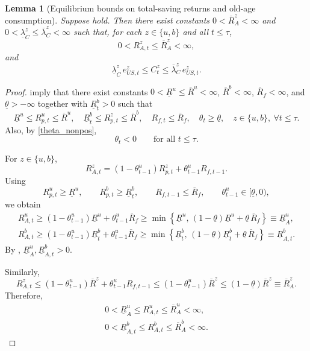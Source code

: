 \documentclass[12pt]{article}
\theoremstyle{plain}
\newtheorem{lem}{Lemma}
\begin{document}
\begin{lem}[Equilibrium bounds on total-saving returns and old-age consumption]\label{lem_total_return_consumption_bounds}
Suppose
hold.
Then there exist constants $0< \overline R^z_A<\infty$ and
$0<\underline\lambda^z_C\le \overline\lambda^z_C<\infty$ such that, for each $z\in\{u,b\}$ and all $t\le\tau$,
\[
0< R_{A,t}^z\le \overline R^z_A<\infty,
\]
and
\[
\underline\lambda^z_C\,e_{US,t}^z
\le
C_t^z
\le
\overline\lambda^z_C\,e_{US,t}^z.
\]
\end{lem}

\begin{proof}
 imply that there exist constants
$0<\underline R^u\le \overline R^u<\infty$, $\overline R^b<\infty$, $\overline R_f<\infty$, and $\underline\theta>-\infty$ together with $\underline R^b_t>0$ such that
\[
\underline R^u\le R_{p,t}^u\le \overline R^u,
\quad
\underline R^b_t\le R_{p,t}^z\le \overline R^b,
\quad
R_{f,t}\le \overline R_f,
\quad
	\theta_t\ge \underline{\theta},
\quad
z\in\{u,b\},\ \forall t\le\tau.
\]
Also, by \eqref{theta_nonpos},
\[
	\theta_t<0
\qquad\text{for all }t\le\tau.
\]

For $z\in\{u,b\}$,
\[
R_{A,t}^z=(1-\theta_{t-1}^u)R_{p,t}^z+\theta_{t-1}^u R_{f,t-1}.
\]
Using
\[
R_{p,t}^u\ge \underline R^u,
\qquad
R_{p,t}^b\ge \underline R^b_t,
\qquad
R_{f,t-1}\le \overline R_f,
\qquad
	\theta_{t-1}^u\in[\underline\theta,0),
\]
we obtain
\begin{align*}
R_{A,t}^u
\ge
(1-\theta_{t-1}^u)\underline R^u+\theta_{t-1}^u\overline R_f
\ge
\min\!\left\{
\underline R^u,\,
(1-\underline\theta)\underline R^u+\underline\theta\,\overline R_f
\right\}
\equiv
\underline R^u_A,
\\
R_{A,t}^b
\ge
(1-\theta_{t-1}^u)\underline R^b_t+\theta_{t-1}^u\overline R_f
\ge
\min\!\left\{
\underline R^b_t,\,
(1-\underline\theta)\underline R^b_t+\underline\theta\,\overline R_f
\right\}
\equiv
\underline R^b_{A,t}.
\end{align*}
By , $\underline R^u_{A}, \underline R^b_{A,t}>0$.

Similarly,
\[
R_{A,t}^z
\le
(1-\theta_{t-1}^u)\overline R^z+\theta_{t-1}^u R_{f,t-1}
\le
(1-\theta_{t-1}^u)\overline R^z
\le
(1-\underline\theta)\overline R^z
\equiv
\overline R^z_A.
\]
Therefore,
\begin{align*}
    0<\underline R^u_{A}\le R_{A,t}^u\le \overline R^u_A<\infty,
    \\
    0<\underline R^b_{A,t}\le R_{A,t}^b\le \overline R^b_A<\infty.
\end{align*}


\end{proof}
\end{document}

